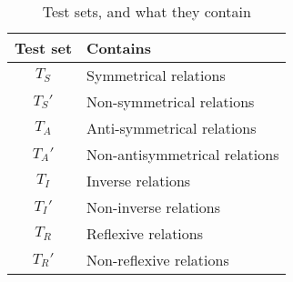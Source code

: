 \begin{table}[htb]
\centering
\begin{minipage}{0.95\columnwidth}
\centering
\caption{Test sets, and what they contain}
\vspace{-3mm}

\begin{tabular}{c|l}\hline
Test set & Contains \\ \hline
$T_S$ & Symmetrical relations \\ 
$T_S'$ & Non-symmetrical relations \\ 
$T_A$ & Anti-symmetrical relations \\ 
$T_A'$ & Non-antisymmetrical relations \\ 
$T_I$ & Inverse relations \\ 
$T_I'$ & Non-inverse relations \\ 
$T_R$ & Reflexive relations \\ 
$T_R'$ & Non-reflexive relations \\ \hline
\end{tabular}

\label{tab:test_set_explanations}
\end{minipage}
\end{table}

